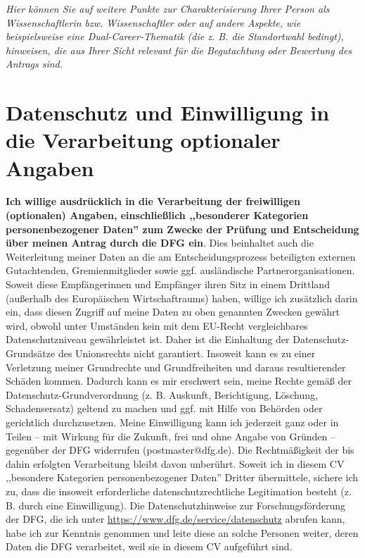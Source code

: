 \documentclass[a4paper,11pt]{article}
\begin{document}
\emph{Hier können Sie auf weitere Punkte zur Charakterisierung Ihrer Person als Wissenschaftlerin bzw. Wissenschaftler oder auf andere Aspekte, wie beispielsweise eine Dual-Career-Thematik (die z.  B. die Standortwahl bedingt), hinweisen, die aus Ihrer Sicht relevant für die Begutachtung oder Bewertung des Antrags sind.}

\section*{Datenschutz und Einwilligung in die Verarbeitung optionaler Angaben}
\footnotesize

\noindent
\textbf{Ich willige ausdrücklich in die Verarbeitung der freiwilligen
(optionalen) Angaben, einschließlich ,,besonderer Kategorien
personenbezogener Daten'' zum Zwecke der Prüfung und Entscheidung über
meinen Antrag durch die DFG ein}.
Dies beinhaltet auch die
Weiterleitung meiner Daten an die am Entscheidungsprozess beteiligten
externen Gutachtenden, Gremienmitglieder sowie ggf. ausländische
Partnerorganisationen. Soweit diese Empfängerinnen und Empfänger ihren
Sitz in einem Drittland (außerhalb des Europäischen Wirtschaftraums)
haben, willige ich zusätzlich darin ein, dass diesen Zugriff auf meine
Daten zu oben genannten Zwecken gewährt wird, obwohl unter Umständen
kein mit dem EU-Recht vergleichbares Datenschutzniveau gewährleistet
ist. Daher ist die Einhaltung der Datenschutz-Grundsätze des
Unionsrechts nicht garantiert. Insoweit kann es zu einer Verletzung
meiner Grundrechte und Grundfreiheiten und daraus resultierender
Schäden kommen. Dadurch kann es mir erschwert sein, meine Rechte gemäß
der Datenschutz-Grundverordnung (z. B. Auskunft, Berichtigung,
Löschung, Schadensersatz) geltend zu machen und ggf. mit Hilfe von
Behörden oder gerichtlich durchzusetzen.
%
Meine Einwilligung kann ich jederzeit ganz oder in Teilen -- mit
Wirkung für die Zukunft, frei und ohne Angabe von Gründen -- gegenüber
der DFG widerrufen (postmaster@dfg.de). Die Rechtmäßigkeit der bis
dahin erfolgten Verarbeitung bleibt davon unberührt. Soweit ich in
diesem CV ,,besondere Kategorien personenbezogener Daten'' Dritter
übermittele, sichere ich zu, dass die insoweit erforderliche
datenschutzrechtliche Legitimation besteht (z. B. durch eine
Einwilligung).
%
Die Datenschutzhinweise zur Forschungsförderung der DFG, die ich unter
\href{https://www.dfg.de/service/datenschutz}{https://www.dfg.de/service/datenschutz}
abrufen kann, habe ich
zur Kenntnis genommen und leite diese an solche Personen weiter, deren
Daten die DFG verarbeitet, weil sie in diesem CV aufgeführt sind.

\end{document}

